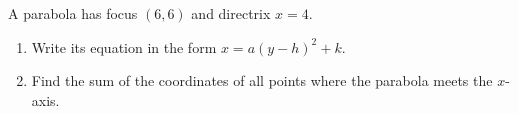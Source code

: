 A parabola has focus $(6,6)$ and directrix $x=4$.
\begin{enumerate}
\item[(a)] Write its equation in the form $x=a(y-h)^2+k$.
\item[(b)] Find the sum of the coordinates of all points where the parabola meets the $x$-axis.
\end{enumerate}
